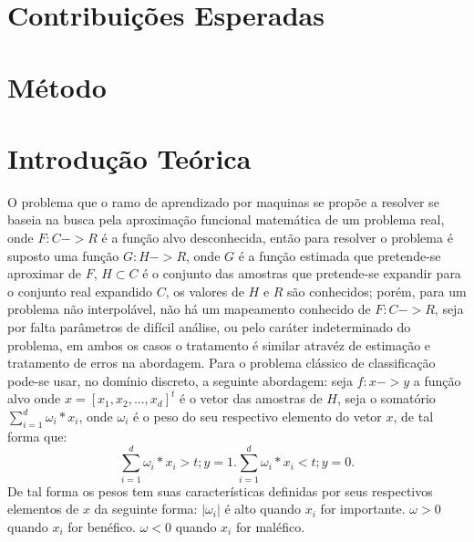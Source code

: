 \documentclass[pfc]{imetex}
\begin{document}
\section{Contribuições Esperadas}

\section{Método}

\section{Introdução Teórica}
    O problema que o ramo de aprendizado por maquinas se propõe a resolver se baseia na busca pela aproximação funcional matemática de um problema real, onde $F:C -> R$ é a função alvo desconhecida, então para resolver o problema é suposto uma função $G:H -> R$, onde $G$ é a função estimada que pretende-se aproximar de $F$, $H \subset C$ é o conjunto das amostras que pretende-se expandir para o conjunto real expandido $C$, os valores de $H$ e $R$ são conhecidos; porém, para um problema não interpolável, não há um mapeamento conhecido de $F:C -> R$, seja por falta parâmetros de difícil análise, ou pelo caráter indeterminado do problema, em ambos os casos o tratamento é similar atravéz de estimação e tratamento de erros na abordagem.
    \newline
    \newline
    Para o problema clássico de classificação pode-se usar, no domínio discreto, a seguinte abordagem: seja $f: x->y$ a função alvo onde $x = [x_1,x_2,...,x_d]^t$ é o vetor das amostras de $H$, seja o somatório $\sum\limits_{i=1}^d \omega_i*x_i$, onde $\omega_i$ é o peso do seu respectivo elemento do vetor $x$, de tal forma que:
    \newline
    \begin{equation}
        \sum\limits_{i=1}^d \omega_i*x_i>t; y = 1.
        \sum\limits_{i=1}^d \omega_i*x_i<t; y = 0.
    \end{equation}
    \newline
    De tal forma os pesos tem suas características definidas por seus respectivos elementos de $x$ da seguinte forma:\newline
    $|\omega_i|$ é alto quando $x_i$ for importante.\newline
    $\omega > 0$ quando $x_i$ for benéfico.\newline
    $\omega < 0$ quando $x_i$ for maléfico.\newline
\end{document}
